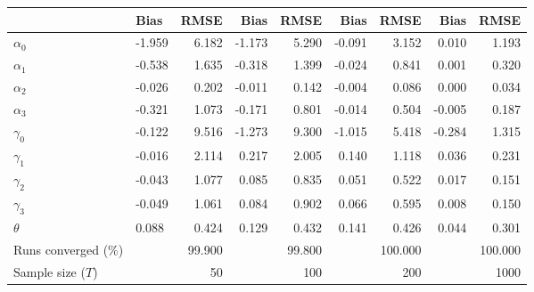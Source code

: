 
\begin{tabular}[t]{llrrrrrrr}
\toprule
  & Bias & RMSE & Bias & RMSE & Bias & RMSE & Bias & RMSE\\
\midrule
$\alpha_{0}$ & -1.959 & 6.182 & -1.173 & 5.290 & -0.091 & 3.152 & 0.010 & 1.193\\
$\alpha_{1}$ & -0.538 & 1.635 & -0.318 & 1.399 & -0.024 & 0.841 & 0.001 & 0.320\\
$\alpha_{2}$ & -0.026 & 0.202 & -0.011 & 0.142 & -0.004 & 0.086 & 0.000 & 0.034\\
$\alpha_{3}$ & -0.321 & 1.073 & -0.171 & 0.801 & -0.014 & 0.504 & -0.005 & 0.187\\
$\gamma_{0}$ & -0.122 & 9.516 & -1.273 & 9.300 & -1.015 & 5.418 & -0.284 & 1.315\\
$\gamma_{1}$ & -0.016 & 2.114 & 0.217 & 2.005 & 0.140 & 1.118 & 0.036 & 0.231\\
$\gamma_{2}$ & -0.043 & 1.077 & 0.085 & 0.835 & 0.051 & 0.522 & 0.017 & 0.151\\
$\gamma_{3}$ & -0.049 & 1.061 & 0.084 & 0.902 & 0.066 & 0.595 & 0.008 & 0.150\\
$\theta$ & 0.088 & 0.424 & 0.129 & 0.432 & 0.141 & 0.426 & 0.044 & 0.301\\
Runs converged (\%) &  & 99.900 &  & 99.800 &  & 100.000 &  & 100.000\\
Sample size ($T$) &  & 50 &  & 100 &  & 200 &  & 1000\\
\bottomrule
\end{tabular}
